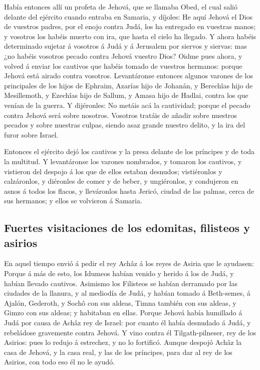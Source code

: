  Había entonces allí un profeta de Jehová, que se llamaba
Obed, el cual salió delante del ejército cuando entraba en Samaria, y
díjoles: He aquí Jehová el Dios de vuestros padres, por el enojo contra
Judá, los ha entregado en vuestras manos; y vosotros los habéis muerto
con ira, que hasta el cielo ha llegado.  Y ahora habéis
determinado sujetar á vosotros á Judá y á Jerusalem por siervos y
siervas: mas ¿no habéis vosotros pecado contra Jehová vuestro Dios?
 Oidme pues ahora, y volved á enviar los cautivos que
habéis tomado de vuestros hermanos: porque Jehová está airado contra
vosotros.  Levantáronse entonces algunos varones de los
principales de los hijos de Ephraim, Azarías hijo de Johanán, y
Berechîas hijo de Mesillemoth, y Ezechîas hijo de Sallum, y Amasa hijo
de Hadlai, contra los que venían de la guerra.  Y
dijéronles: No metáis acá la cautividad; porque el pecado contra Jehová
será sobre nosotros. Vosotros tratáis de añadir sobre nuestros pecados y
sobre nuestras culpas, siendo asaz grande nuestro delito, y la ira del
furor sobre Israel.

 Entonces el ejército dejó los cautivos y la presa delante
de los príncipes y de toda la multitud.  Y levantáronse los
varones nombrados, y tomaron los cautivos, y vistieron del despojo á los
que de ellos estaban desnudos; vistiéronlos y calzáronlos, y diéronles
de comer y de beber, y ungiéronlos, y condujeron en asnos á todos los
flacos, y lleváronlos hasta Jericó, ciudad de las palmas, cerca de sus
hermanos; y ellos se volvieron á Samaria.

\hypertarget{fuertes-visitaciones-de-los-edomitas-filisteos-y-asirios}{%
\subsection{Fuertes visitaciones de los edomitas, filisteos y
asirios}\label{fuertes-visitaciones-de-los-edomitas-filisteos-y-asirios}}

 En aquel tiempo envió á pedir el rey Achâz á los reyes de
Asiria que le ayudasen:  Porque á más de esto, los Idumeos
habían venido y herido á los de Judá, y habían llevado cautivos.
 Asimismo los Filisteos se habían derramado por las
ciudades de la llanura, y al mediodía de Judá, y habían tomado á
Beth-semes, á Ajalón, Gederoth, y Sochô con sus aldeas, Timna también
con sus aldeas, y Gimzo con sus aldeas; y habitaban en ellas.
 Porque Jehová había humillado á Judá por causa de Achâz
rey de Israel: por cuanto él había desnudado á Judá, y rebeládose
gravemente contra Jehová.  Y vino contra él
Tilgath-pilneser, rey de los Asirios: pues lo redujo á estrechez, y no
lo fortificó.  Aunque despojó Achâz la casa de Jehová, y la
casa real, y las de los príncipes, para dar al rey de los Asirios, con
todo eso él no le ayudó.

